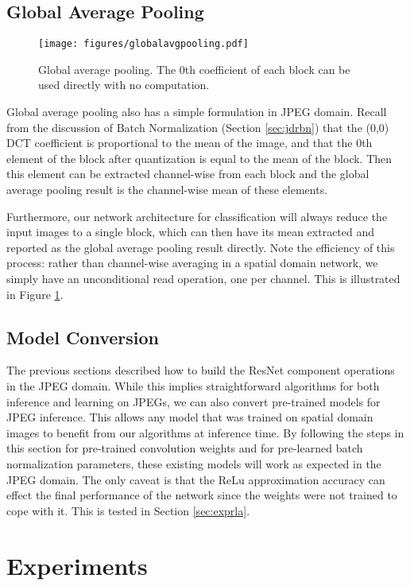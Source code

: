 \documentclass[10pt,twocolumn,letterpaper]{article}
\begin{document}
\subsection{Global Average Pooling}\begin{figure}
    \centering
    \texttt{[image: figures/globalavgpooling.pdf]}
    \caption{Global average pooling. The 0th coefficient of each block can be used directly with no computation.}
    \label{fig:gap}
\end{figure}

Global average pooling also has a simple formulation in JPEG domain. Recall from the discussion of Batch Normalization (Section \ref{sec:jdrbn}) that the (0,0) DCT coefficient is proportional to the mean of the image, and that the 0th element of the block after quantization is equal to the mean of the block. Then this element can be extracted channel-wise from each block and the global average pooling result is the channel-wise mean of these elements.

Furthermore, our network architecture for classification will always reduce the input images to a single block, which can then have its mean extracted and reported as the global average pooling result directly. Note the efficiency of this process: rather than channel-wise averaging in a spatial domain network, we simply have an unconditional read operation, one per channel. This is illustrated in Figure \ref{fig:gap}.

\subsection{Model Conversion}

The previous sections described how to build the ResNet component operations in the JPEG domain. While this implies straightforward algorithms for both inference and learning on JPEGs, we can also convert pre-trained models for JPEG inference. This allows any model that was trained on spatial domain images to benefit from our algorithms at inference time. By following the steps in this section for pre-trained convolution weights and for pre-learned batch normalization parameters, these existing models will work as expected in the JPEG domain. The only caveat is that the ReLu approximation accuracy can effect the final performance of the network since the weights were not trained to cope with it. This is tested in Section \ref{sec:exprla}.\section{Experiments}
\end{document}
